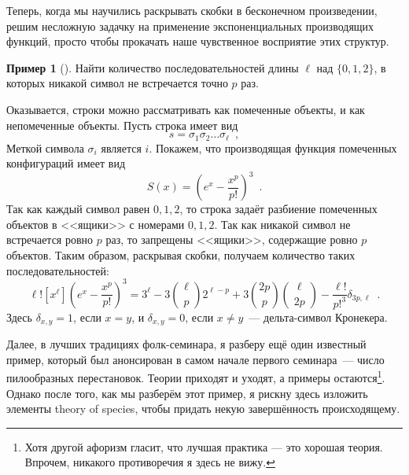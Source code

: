 \documentclass{article}
\theoremstyle{definition}
\newtheorem{example}{Пример}
\begin{document}
Теперь, когда мы научились раскрывать скобки в бесконечном произведении, решим 
несложную задачку на применение экспоненциальных производящих функций, просто 
чтобы прокачать наше чувственное восприятие этих структур.

\begin{example}[{\cite[Пример 3.2.13, стр. 167]{gouldenjackson}}]
	Найти количество последовательностей длины \( \ell \) над \( \{ 0,1,2 \} 
	\), в которых никакой символ не встречается точно \( p \) раз.
	
	Оказывается, строки можно рассматривать как помеченные объекты, и как 
	непомеченные объекты. Пусть строка имеет вид
	\[
		s = \sigma_1 \sigma_2 \ldots \sigma_\ell  \enspace ,
	\]
	Меткой символа \( \sigma_i \) является \( i \). Покажем, что производящая 
	функция помеченных конфигураций имеет вид
	\[
		S(x) = \left(
			e^{x} - \dfrac{x^p}{p!}
		\right)^{3} \enspace .
	\]
	Так как каждый символ равен \( 0, 1, 2 \), то строка задаёт разбиение 
	помеченных объектов в <<ящики>> с номерами \( 0, 1, 2 \). Так как никакой 
	символ не встречается ровно \( p \) раз, то запрещены <<ящики>>, содержащие 
	ровно \( p \) объектов. Таким образом, раскрывая скобки, получаем 
	количество таких последовательностей:
	\[
		\ell! [x^\ell] \left(
					e^{x} - \dfrac{x^p}{p!}
				\right)^{3} = 3^{\ell} - 3 {\ell \choose p} 2^{\ell - p} + 3 
				{2p \choose p}{\ell \choose 2p} - \dfrac{\ell!}{p!^3} 
				\delta_{3p, \ell} \enspace .
	\]
	Здесь \( \delta_{x,y} = 1 \), если \( x = y \), и \( \delta_{x,y} = 0 \), 
	если \( x \neq y \)~--- дельта-символ Кронекера.
\end{example}

Далее, в лучших традициях фолк-семинара, я разберу ещё один известный пример, 
который был анонсирован в самом начале первого семинара~--- число пилообразных 
перестановок. Теории приходят и уходят, а примеры остаются\footnote{Хотя другой 
афоризм гласит, что лучшая практика --- это хорошая теория. Впрочем, никакого 
противоречия я здесь не вижу.}. Однако после того, как мы разберём этот пример, 
я рискну здесь изложить элементы theory of species, чтобы 
придать некую завершённость происходящему.
\end{document}
